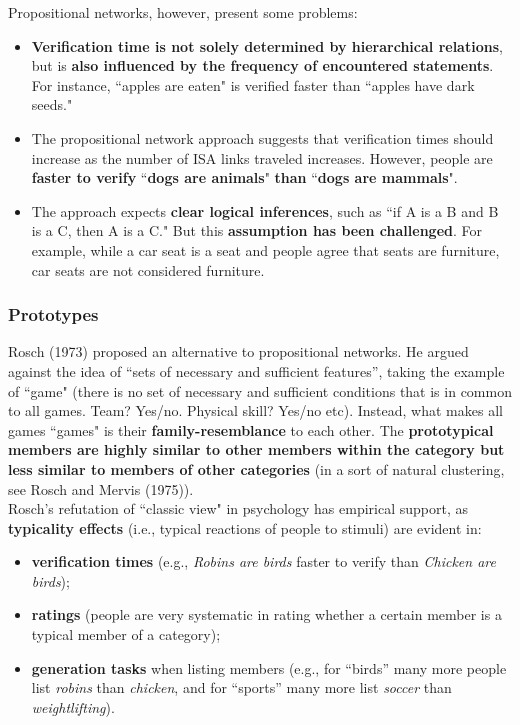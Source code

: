 Propositional networks, however, present some problems:
\begin{itemize}
    \item \textbf{Verification time is not solely determined by hierarchical relations}, but is \textbf{also influenced by the frequency of encountered statements}. For instance, ``apples are eaten" is verified faster than ``apples have dark seeds."
    \item The propositional network approach suggests that verification times should increase as the number of ISA links traveled increases. However, people are \textbf{faster to verify} ``\textbf{dogs are animals}" \textbf{than} ``\textbf{dogs are mammals}".
    \item The approach expects \textbf{clear logical inferences}, such as ``if A is a B and B is a C, then A is a C." But this \textbf{assumption has been challenged}. For example, while a car seat is a seat and people agree that seats are furniture, car seats are not considered furniture.
\end{itemize}

\subsubsection{Prototypes}
Rosch (1973) proposed an alternative to propositional networks. He argued against the idea of ``sets of necessary and sufficient features”, taking the example of ``game" (there is no set of necessary and sufficient conditions that is in common to all games. Team? Yes/no. Physical skill? Yes/no etc).
Instead, what makes all games ``games" is their \textbf{family-resemblance} to each other. The \textbf{prototypical members are highly similar to other members within the category but less similar to members of other categories} (in a sort of natural clustering, see \notedv Rosch and Mervis (1975)).\\

Rosch's refutation of ``classic view" in psychology has empirical support, as \textbf{typicality effects} (i.e., typical reactions of people to stimuli) are evident in:
\begin{itemize}
    \item \textbf{verification times} (e.g., \textit{Robins are birds} faster to verify than \textit{Chicken are birds});
    \item \textbf{ratings} (people are very systematic in rating whether a certain member is a typical member of a category);
    \item \textbf{generation tasks} when listing members (e.g., for ``birds” many more people list \textit{robins} than \textit{chicken}, and for ``sports” many more list \textit{soccer} than \textit{weightlifting}). 
\end{itemize}

